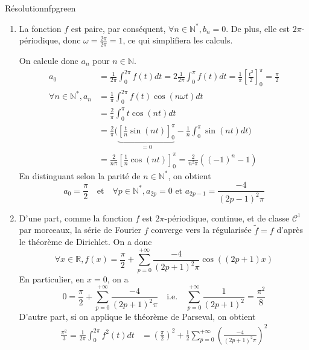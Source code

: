     \begin{omed}{Résolution}{nfpgreen}
        \begin{enumerate}
            \item La fonction $f$ est paire, par conséquent, $\forall n \in \mathbb{N}^*, b_n = 0$. De plus, elle est $2\pi$-périodique, donc $\omega = \frac{2\pi}{2\pi} = 1$, ce qui simplifiera les calculs.
            
            On calcule donc $a_n$ pour $n \in \mathbb{N}$. 
            \begin{align*}
                a_0 &= \frac{1}{2\pi} \int_{0}^{2\pi} f(t)dt = 2 \frac{1}{2\pi} \int_{0}^{\pi} f(t)dt = \frac{1}{\pi} \left[\frac{t^2}{2}\right]_0^{\pi} = \frac{\pi}{2} \\
                \forall n \in \mathbb{N}^*, a_n &= \frac{1}{\pi} \int_{0}^{2\pi} f(t) \cos(n\omega t) dt \\
                &= \frac{2}{\pi} \int_{0}^{\pi} t\cos(nt)dt \\
                &= \frac{2}{\pi} \Bigg(\underbrace{\left[\frac{t}{n}\sin(nt)\right]_0^{\pi}}_{= 0} - \frac{1}{n} \int_{0}^{\pi} \sin(nt)dt\Bigg) \\
                &= \frac{2}{n \pi } \left[\frac{1}{n}\cos(nt)\right]_0^{\pi} = \frac{2}{n^2 \pi} \left((-1)^n - 1\right)
            \end{align*}
            En distinguant selon la parité de $n \in \mathbb{N}^*$, on obtient 
            \[ a_0 = \frac{\pi}{2} \quad \text{et} \quad \forall p \in \mathbb{N}^*, a_{2p} = 0 \text{ et } a_{2p-1} = \frac{-4}{(2p-1)^2 \pi} \]
            \item D’une part, comme la fonction $f$ est $2\pi$-périodique, continue, et de classe $\mathcal{C}^1$ par morceaux, la série de Fourier $f$ converge vers la régularisée $\tilde{f} = f$ d’après le théorème de Dirichlet. On a donc 
            \[ \forall x \in \mathbb{R}, f(x) = \frac{\pi}{2} + \sum\limits_{p=0}^{+\infty} \frac{-4}{(2p+1)^2 \pi} \cos((2p+1)x) \] 
            En particulier, en $x = 0$, on a 
            \[ 0 = \frac{\pi}{2} + \sum\limits_{p=0}^{+\infty} \frac{-4}{(2p+1)^2 \pi} \quad \text{i.e.} \quad \sum\limits_{p=0}^{+\infty} \frac{1}{(2p+1)^2} = \frac{\pi^2}{8} \]
            D’autre part, si on applique le théorème de Parseval, on obtient 
            \begin{align*}
                \frac{\pi^2}{3} = \frac{1}{2\pi} \int_{0}^{2 \pi} f^2(t) dt &= \left(\frac{\pi}{2}\right)^2 + \frac{1}{2} \sum\limits_{p=0}^{+\infty} \left(\frac{-4}{(2p+1)^2 \pi}\right)^2 \\

\end{align*}
\end{enumerate}
\end{omed}
